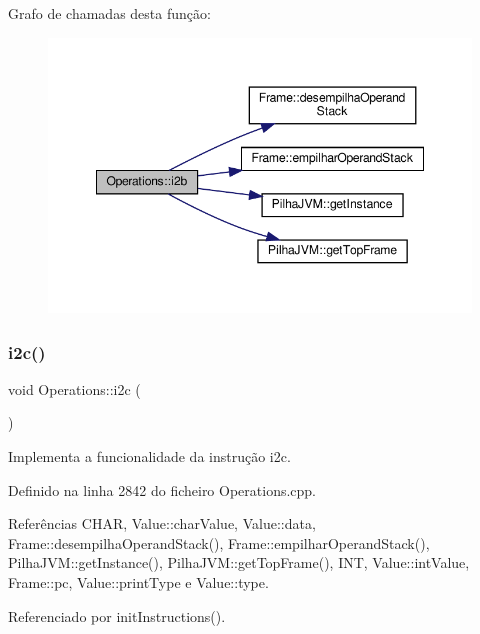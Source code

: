 Grafo de chamadas desta função\+:\nopagebreak
\begin{figure}[H]
\begin{center}
\leavevmode
\includegraphics[width=348pt]{classOperations_adfe0344bae5a1252330b7324e827ed35_cgraph}
\end{center}
\end{figure}
\mbox{\label{classOperations_a43b01132bf9acf598d0ced8719c194c7}} 
\subsubsection{\texorpdfstring{i2c()}{i2c()}}
{\footnotesize\ttfamily void Operations\+::i2c (\begin{DoxyParamCaption}{ }\end{DoxyParamCaption})\hspace{0.3cm}{\ttfamily [private]}}



Implementa a funcionalidade da instrução i2c. 



Definido na linha 2842 do ficheiro Operations.\+cpp.



Referências C\+H\+AR, Value\+::char\+Value, Value\+::data, Frame\+::desempilha\+Operand\+Stack(), Frame\+::empilhar\+Operand\+Stack(), Pilha\+J\+V\+M\+::get\+Instance(), Pilha\+J\+V\+M\+::get\+Top\+Frame(), I\+NT, Value\+::int\+Value, Frame\+::pc, Value\+::print\+Type e Value\+::type.



Referenciado por init\+Instructions().

